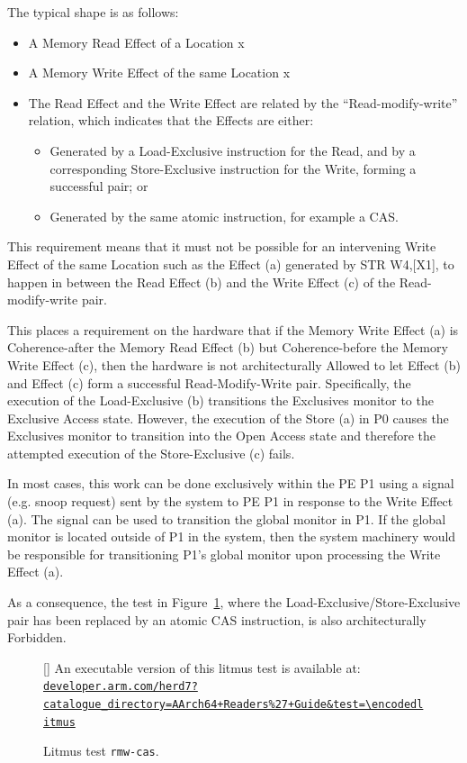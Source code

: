 \documentclass{book}
\newcommand{\litmusinput}[1]{%
}
\newcommand{\herdweburl}{https://developer.arm.com/herd7}
\newcommand{\herdweburldisplay}{developer.arm.com/herd7}
\newcommand{\litmusinputwithlinkat}[3][]{%
  \par
  \begin{figure}[#2]
    \litmusinput{#3}%
    \par\smallskip
    {\footnotesize
    \begingroup
    \StrSubstitute{#3}{+}{\%2B}[\encodedlitmus]%
    \edef\targeturl{\herdweburl?catalogue_directory=AArch64+Readers\%27+Guide\&test=\encodedlitmus}%
    \edef\displayurl{\herdweburldisplay?catalogue_directory=AArch64+Readers\%27+Guide&test=\encodedlitmus}%
    An executable version of this litmus test is available at:
    \href{\targeturl}{\nolinkurl{\displayurl}}%
    \endgroup
    \par}
    \caption{Litmus test \texttt{#3}.}
    \if\relax\detokenize{#1}\relax\else\label{#1}\fi
  \end{figure}
}
\newcommand{\litmusinputwithlink}[2][]{%
  \litmusinputwithlinkat[#1]{H}{#2}%
}
\begin{document}
The typical shape is as follows: 
\begin{itemize}
\item A Memory Read Effect of a Location x 
\item A Memory Write Effect of the same Location x 
\item The Read Effect and the Write Effect are related by the “Read-modify-write” relation, which indicates that the Effects are either: 
  \begin{itemize}
  \item Generated by a Load-Exclusive instruction for
  the Read, and by a corresponding Store-Exclusive
  instruction for the Write, forming a successful
  pair; or 
  \item Generated by the same atomic instruction, for
  example a CAS.
  \end{itemize}
\end{itemize}

This requirement means that it must not be possible
for an intervening Write Effect of the same Location
such as the Effect (a) generated by STR W4,[X1], to
happen in between the Read Effect (b) and the Write
Effect (c) of the Read-modify-write pair. 

This places a requirement on the hardware that if the Memory Write Effect (a)
is Coherence-after the Memory Read Effect (b) but Coherence-before the Memory
Write Effect (c), then the hardware is not architecturally Allowed to let
Effect (b) and Effect (c) form a successful Read-Modify-Write pair.
%
Specifically, the execution of the Load-Exclusive (b) transitions the
Exclusives monitor to the Exclusive Access state. However, the execution of the
Store (a) in P0 causes the Exclusives monitor to transition into the Open
Access state and therefore the attempted execution of the Store-Exclusive (c)
fails.

In most cases, this work can be done exclusively within the PE P1 using a
signal (e.g. snoop request) sent by the system to PE P1 in response to the
Write Effect (a). The signal can be used to transition the global monitor in
P1. If the global monitor is located outside of P1 in the system, then the
system machinery would be responsible for transitioning P1’s global monitor
upon processing the Write Effect (a).  
 
As a consequence, the test in Figure~\ref{fig:litmus-rmw-cas}, where the
Load-Exclusive/Store-Exclusive pair has been replaced by an atomic CAS
instruction, is also architecturally Forbidden.
\litmusinputwithlink[fig:litmus-rmw-cas]{rmw-cas}
\end{document}
